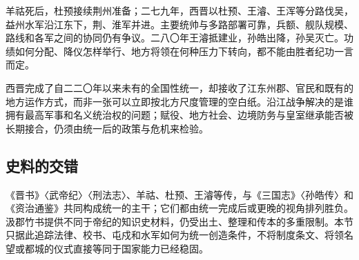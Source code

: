 羊祜死后，杜预接续荆州准备；二七九年，西晋以杜预、王濬、王浑等分路伐吴，益州水军沿江东下，荆、淮军并进。主要统帅与多路部署可靠，兵额、舰队规模、路线和各军之间的协同仍有争议。二八〇年王濬抵建业，孙皓出降，孙吴灭亡。功绩如何分配、降仪怎样举行、地方将领在何种压力下转向，都不能由胜者纪功一言而定。

西晋完成了自二二〇年以来未有的全国性统一，却接收了江东州郡、官民和既有的地方运作方式，而非一张可以立即按北方尺度管理的空白纸。沿江战争解决的是谁拥有最高军事和名义统治权的问题；赋役、地方社会、边境防务与皇室继承能否被长期接合，仍须由统一后的政策与危机来检验。

\subsection{史料的交错}

《晋书》〈武帝纪〉〈刑法志〉、羊祜、杜预、王濬等传，与《三国志》〈孙皓传〉和《资治通鉴》共同构成统一的主干；它们都由统一完成后或更晚的视角排列胜负。汲郡竹书提供不同于帝纪的知识史材料，仍受出土、整理和传本的多重限制。本节只据此追踪法律、校书、屯戍和水军如何为统一创造条件，不将制度条文、将领名望或都城的仪式直接等同于国家能力已经稳固。
